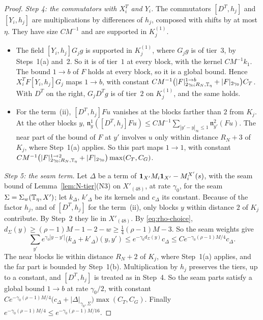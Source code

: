 \begin{proof}
\emph{Step 4: the commutators with $X_i^T$ and $Y_i$.} The commutators $[D^T,h_j]$ and $[Y_i,h_j]$ are multiplications by differences of $h_j$, composed with shifts by at most $\eta$. They have size $CM^{-1}$ and are supported in $K_j^{(1)}$.
\begin{itemize}
\item The field $[Y_i,h_j]G_jg$ is supported in $K_j^{(1)}$, where $G_jg$ is of tier~$3$, by Steps~1(a) and~2. So it is of tier~$1$ at every block, with the kernel $CM^{-1}k_1$. The bound $1\to b$ of $F$ holds at every block, so it is a global bound. Hence $X_i^TF[Y_i,h_j]G_j$ maps $1\to b$, with constant $CM^{-1}\big(|F|^{1\to b}_{2\gamma_0;R_N,\mathbb T_\eta}+|F|_{2\gamma_0}\big)C_T$. With $D^T$ on the right, $G_jD^Tg$ is of tier~$2$ on $K_j^{(1)}$, and the same holds.
\item For the term~(ii), $[D^T,h_j]Fu$ vanishes at the blocks farther than $2$ from $K_j$. At the other blocks $y$, $\mathfrak n^1_y([D^T,h_j]Fu)\le CM^{-1}\sum_{|y'-y|_\infty\le1}\mathfrak n^2_{y'}(Fu)$. The near part of the bound of $F$ at $y'$ involves $u$ only within distance $R_N+3$ of $K_j$, where Step~1(a) applies. So this part maps $1\to1$, with constant $CM^{-1}\big(|F|^{1\to2}_{2\gamma_0;R_N,\mathbb T_\eta}+|F|_{2\gamma_0}\big)\max(C_T,C_G)$.
\end{itemize}

\emph{Step 5: the seam term.} Let $\Delta$ be a term of $\mathbf 1_{X'}M_i\mathbf 1_{X'}-M_i^{X'}(s)$, with the seam bound of Lemma~\ref{lem:N-tier}(N3) on $X'_{(48)}$, at rate $\gamma_0$, for the seam $\Sigma=\Sigma_w(\mathbb T_\eta,X')$; let $k_\Delta$, $k'_\Delta$ be its kernels and $c_\Delta$ its constant. Because of the factor $h_j$, and of $[D^T,h_j]$ for the term~(ii), only blocks $y$ within distance $2$ of $K_j$ contribute. By Step~2 they lie in $X'_{(48)}$. By \eqref{eq:rho-choice}, $d_\Sigma(y)\ge(\rho-1)M-1-2-w\ge\frac14(\rho-1)M-3$. So the seam weights give
\[
\sum_{y'}e^{\gamma_0|y-y'|}\big(k_\Delta+k'_\Delta\big)(y,y')\le e^{-\gamma_0d_\Sigma(y)}c_\Delta\le Ce^{-\gamma_0(\rho-1)M/4}c_\Delta .
\]
The near blocks lie within distance $R_N+2$ of $K_j$, where Step~1(a) applies, and the far part is bounded by Step~1(b). Multiplication by $h_j$ preserves the tiers, up to a constant, and $[D^T,h_j]$ is treated as in Step~4. So the seam parts satisfy a global bound $1\to b$ at rate $\gamma_0/2$, with constant $Ce^{-\gamma_0(\rho-1)M/4}\big(c_\Delta+|\Delta|_{\gamma_0,\Sigma}\big)\max(C_T,C_G)$. Finally $e^{-\gamma_0(\rho-1)M/4}\le e^{-\gamma_0(\rho-1)M/16}$.


\end{proof}
